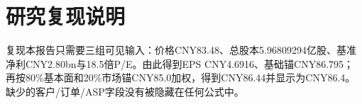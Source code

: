 \section{研究复现说明}

复现本报告只需要三组可见输入：价格CNY83.48、总股本5.96809294亿股、基准净利CNY2.80bn与18.5倍P/E。由此得到EPS CNY4.6916、基础锚CNY86.795；再按80\%基本面和20\%市场锚CNY85.0加权，得到CNY86.44并显示为CNY86.4。缺少的客户/订单/ASP字段没有被隐藏在任何公式中。

